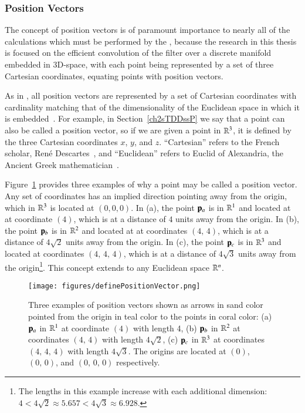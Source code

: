 %
%
\subsubsection{Position Vectors}
\label{ch2sETBssLAsssPV}
The concept of position vectors is of paramount importance to nearly all of the calculations which must be performed by the , because the research in this thesis is focused on the efficient convolution of the filter over a discrete manifold embedded in 3D-space, with each point being represented by a set of three Cartesian coordinates, equating points with position vectors.

As in \tdd{}, all position vectors are represented by a set of Cartesian coordinates with cardinality matching that of the dimensionality of the Euclidean space in which it is embedded~\cite{Weisstein19l}. For example, in Section~\ref{ch2sTDDssP} we say that a point can also be called a position vector, so if we are given a point in $\mathbb{R}^{3}$, it is defined by the three Cartesian coordinates $x$, $y$, and $z$. ``Cartesian'' refers to the French scholar, René Descartes~\cite{EB1}, and ``Euclidean'' refers to Euclid of Alexandria, the Ancient Greek mathematician~\cite{EB2}.

Figure~\ref{fig:definePositionVector} provides three examples of why a point may be called a position vector. Any set of coordinates has an implied direction pointing away from the origin, which in $\mathbb{R}^{3}$ is located at $(0, 0, 0)$. In (a), the point $\mathbf{p}_a$ is in $\mathbb{R}^{1}$ and located at at coordinate $(4)$, which is at a distance of $4$ units away from the origin. In (b), the point $\mathbf{p}_b$ is in $\mathbb{R}^{2}$ and located at at coordinates $(4,\,4)$, which is at a distance of $4\sqrt{2}$ units away from the origin. In (c), the point $\mathbf{p}_c$ is in $\mathbb{R}^{3}$ and located at coordinates $(4,\,4,\,4)$, which is at a distance of $4\sqrt{3}$ units away from the origin\footnote{The lengths in this example increase with each additional dimension: $4 < 4\sqrt{2} \approx 5.657 < 4\sqrt{3} \approx 6.928$.}. This concept extends to any Euclidean space $\mathbb{R}^{n}$.

\begin{figure}[ht]
\ffigbox
	{\texttt{[image: figures/definePositionVector.png]}}
	{\caption[Thre Examples of Position Vectors]{Three examples of position vectors shown as arrows in sand color pointed from the origin in teal color to the points in coral color: (a) $\mathbf{p}_a$ in $\mathbb{R}^{1}$ at coordinate $(4)$ with length 4, (b) $\mathbf{p}_b$ in $\mathbb{R}^{2}$ at coordinates $(4,\,4)$ with length $4\sqrt{2}$, (c) $\mathbf{p}_c$ in $\mathbb{R}^{3}$ at coordinates $(4,\,4,\,4)$ with length $4\sqrt{3}$. The origins are located at $(0)$, $(0,\,0)$, and $(0,\,0,\,0)$ respectively.}\label{fig:definePositionVector}}
\end{figure}

